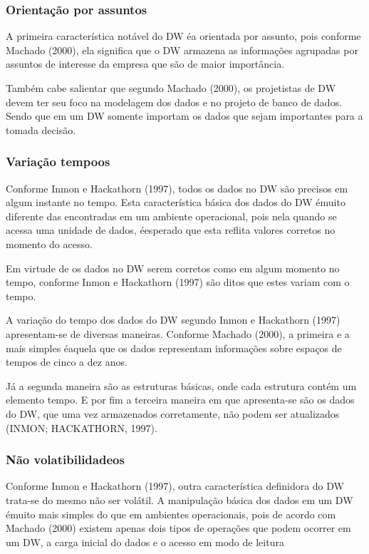 \subsubsection{Orienta\c{c}\~{a}o por assuntos}

A primeira caracter\'{i}stica not\'{a}vel do DW \'{e}a orientada por assunto, pois conforme Machado (2000), ela significa que o DW armazena as informa\c{c}\~{o}es agrupadas por assuntos de interesse da empresa que s\~{a}o de maior importância.

Tamb\'{e}m cabe salientar que segundo Machado (2000), os projetistas de DW devem ter seu foco na modelagem dos dados e no projeto de banco de dados. Sendo que em um DW somente importam os dados que sejam importantes para a tomada decis\~{a}o.

\subsubsection{Varia\c{c}\~{a}o tempoos}

Conforme Inmon e Hackathorn (1997), todos os dados no DW s\~{a}o precisos em algum instante no tempo. Esta caracter\'{i}stica b\'{a}sica dos dados do DW \'{e}muito diferente das encontradas em um ambiente operacional, pois nela quando se acessa uma unidade de dados, \'{e}esperado que esta reflita valores corretos no momento do acesso.

Em virtude de os dados no DW serem corretos como em algum momento no tempo, conforme Inmon e Hackathorn (1997) s\~{a}o ditos que estes variam com o tempo.

A varia\c{c}\~{a}o do tempo dos dados do DW segundo Inmon e Hackathorn (1997) apresentam-se de diversas maneiras. Conforme Machado (2000), a primeira e a mais simples \'{e}aquela que os dados representam informa\c{c}\~{o}es sobre espa\c{c}os de tempos de cinco a dez anos.

J\'{a} a segunda maneira s\~{a}o as estruturas b\'{a}sicas, onde cada estrutura cont\'{e}m um elemento tempo. E por fim a terceira maneira em que apresenta-se s\~{a}o os dados do DW, que uma vez armazenados corretamente, n\~{a}o podem ser atualizados (INMON; HACKATHORN, 1997).

\subsubsection{N\~{a}o volatibilidadeos}

Conforme Inmon e Hackathorn (1997), outra caracter\'{i}stica definidora do DW trata-se do mesmo n\~{a}o ser vol\'{a}til. A manipula\c{c}\~{a}o b\'{a}sica dos dados em um DW \'{e}muito mais simples do que em ambientes operacionais, pois de acordo com Machado (2000) existem apenas dois tipos de opera\c{c}\~{o}es que podem ocorrer em um DW, a carga inicial do dados e o acesso em modo de leitura

